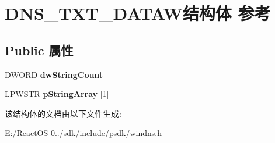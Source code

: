 \hypertarget{struct_d_n_s___t_x_t___d_a_t_a_w}{}\section{D\+N\+S\+\_\+\+T\+X\+T\+\_\+\+D\+A\+T\+A\+W结构体 参考}
\label{struct_d_n_s___t_x_t___d_a_t_a_w}
\subsection*{Public 属性}
\begin{DoxyCompactItemize}
\item 
\mbox{\label{struct_d_n_s___t_x_t___d_a_t_a_w_a9bf9edba9f2b5835a3764500bcf63487}} 
D\+W\+O\+RD {\bfseries dw\+String\+Count}
\item 
\mbox{\label{struct_d_n_s___t_x_t___d_a_t_a_w_ab7c69c556d0309c92f0feddc2ee77f6c}} 
L\+P\+W\+S\+TR {\bfseries p\+String\+Array} \mbox{[}1\mbox{]}
\end{DoxyCompactItemize}


该结构体的文档由以下文件生成\+:\begin{DoxyCompactItemize}
\item 
E\+:/\+React\+O\+S-\/0../sdk/include/psdk/windns.\+h\end{DoxyCompactItemize}
